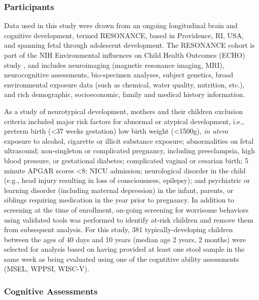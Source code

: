 \documentclass{article}
\begin{document}
\subsubsection*{Participants}

Data used in this study were drawn from an ongoing longitudinal
brain and cognitive development, termed RESONANCE, based in Providence, RI, USA,
and spanning fetal through adolescent development. The
RESONANCE cohort is part of the NIH Environmental influences
on Child Health Outcomes (ECHO) study
\cite{forrestAdvancingScienceChildren2018,gillmanEnvironmentalInfluencesChild2018},
and includes neuroimaging (magnetic
resonance imaging, MRI), neurocognitive assessments, bio-specimen
analyses, subject genetics, broad environmental exposure data
(such as chemical, water quality, nutrition, etc.), and
rich demographic, socioeconomic, family and medical history information.

As a study of neurotypical development, mothers and their children
exclusion criteria included major risk factors for abnormal or atypical development,
i.e., preterm birth (\textless 37 weeks gestation) low birth weight (\textless 1500g),
\textit{in utero} exposure to alcohol, cigarette or illicit substance exposure;
abnormalities on fetal ultrasound; non-singleton or complicated pregnancy,
including preeclampsia, high blood pressure, or gestational diabetes;
complicated vaginal or cesarian birth; 5 minute APGAR scores \textless 8;
NICU admission; neurological disorder in the child
(e.g., head injury resulting in loss of consciousness, epilepsy);
and psychiatric or learning disorder (including maternal depression)
in the infant, parents, or siblings requiring medication in the year prior to pregnancy.
In addition to screening at
the time of enrollment, on-going screening for worrisome behaviors using
validated tools was performed to identify at-risk children and remove
them from subsequent analysis.
For this study, 381 typically-developing children between the
ages of 40 days and 10 years (median age 2 years, 2 months) were
selected for analysis based on having provided at least one stool sample
in the same week as being evaluated using one of the cogntitive ability
assessments (MSEL, WPPSI, WISC-V).

\subsubsection*{Cognitive Assessments}
\end{document}
